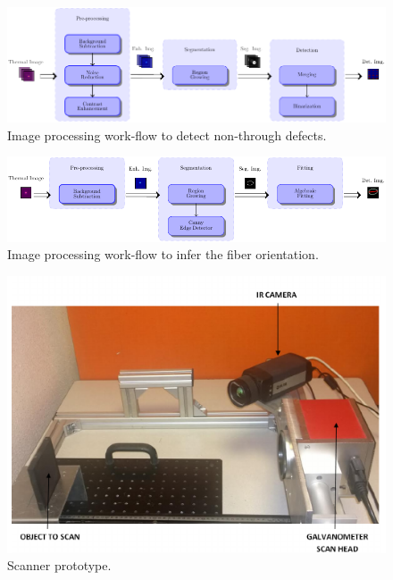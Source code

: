 \documentclass[12pt]{spieman}
\begin{document}
\begin{spacing}{2}
\begin{figure}
  \label{fig:3}
\end{figure}

\newpage \begin{figure}\centering\includegraphics{graph_detection_detect}  
  \caption{Image processing work-flow to detect non-through defects.}
  \label{fig:wkdetection}
\end{figure}

\newpage \begin{figure}\centering\includegraphics{graph_fiber}  
	\caption{Image processing work-flow to infer the fiber orientation.}
  \label{fig:wkfiber}
\end{figure}

\newpage \begin{figure}\centering\includegraphics{Fig6}  
	\caption{Scanner prototype.}
  \label{fig:4}
\end{figure}


\end{spacing}
\end{document}
